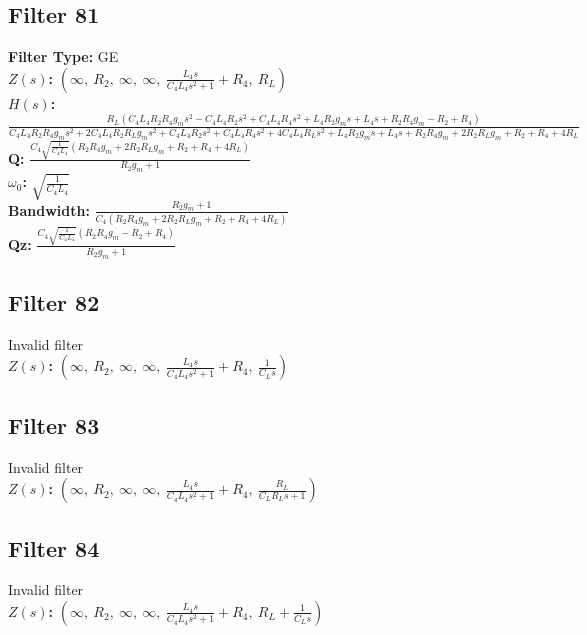 \documentclass{article}
\begin{document}
\subsection*{Filter 81}
\textbf{Filter Type:} GE \\ 
\textbf{$Z(s)$:} $\left( \infty, \  R_{2}, \  \infty, \  \infty, \  \frac{L_{4} s}{C_{4} L_{4} s^{2} + 1} + R_{4}, \  R_{L}\right)$ \\ 
\textbf{$H(s)$:} $\frac{R_{L} \left(C_{4} L_{4} R_{2} R_{4} g_{m} s^{2} - C_{4} L_{4} R_{2} s^{2} + C_{4} L_{4} R_{4} s^{2} + L_{4} R_{2} g_{m} s + L_{4} s + R_{2} R_{4} g_{m} - R_{2} + R_{4}\right)}{C_{4} L_{4} R_{2} R_{4} g_{m} s^{2} + 2 C_{4} L_{4} R_{2} R_{L} g_{m} s^{2} + C_{4} L_{4} R_{2} s^{2} + C_{4} L_{4} R_{4} s^{2} + 4 C_{4} L_{4} R_{L} s^{2} + L_{4} R_{2} g_{m} s + L_{4} s + R_{2} R_{4} g_{m} + 2 R_{2} R_{L} g_{m} + R_{2} + R_{4} + 4 R_{L}}$ \\ 
\textbf{Q:} $\frac{C_{4} \sqrt{\frac{1}{C_{4} L_{4}}} \left(R_{2} R_{4} g_{m} + 2 R_{2} R_{L} g_{m} + R_{2} + R_{4} + 4 R_{L}\right)}{R_{2} g_{m} + 1}$ \\ 
\textbf{$\omega_0$:} $\sqrt{\frac{1}{C_{4} L_{4}}}$ \\ 
\textbf{Bandwidth:} $\frac{R_{2} g_{m} + 1}{C_{4} \left(R_{2} R_{4} g_{m} + 2 R_{2} R_{L} g_{m} + R_{2} + R_{4} + 4 R_{L}\right)}$ \\ 
\textbf{Qz:} $\frac{C_{4} \sqrt{\frac{1}{C_{4} L_{4}}} \left(R_{2} R_{4} g_{m} - R_{2} + R_{4}\right)}{R_{2} g_{m} + 1}$ \\ 
\subsection*{Filter 82}
Invalid filter \\ 
\textbf{$Z(s)$:} $\left( \infty, \  R_{2}, \  \infty, \  \infty, \  \frac{L_{4} s}{C_{4} L_{4} s^{2} + 1} + R_{4}, \  \frac{1}{C_{L} s}\right)$ \\ 
\subsection*{Filter 83}
Invalid filter \\ 
\textbf{$Z(s)$:} $\left( \infty, \  R_{2}, \  \infty, \  \infty, \  \frac{L_{4} s}{C_{4} L_{4} s^{2} + 1} + R_{4}, \  \frac{R_{L}}{C_{L} R_{L} s + 1}\right)$ \\ 
\subsection*{Filter 84}
Invalid filter \\ 
\textbf{$Z(s)$:} $\left( \infty, \  R_{2}, \  \infty, \  \infty, \  \frac{L_{4} s}{C_{4} L_{4} s^{2} + 1} + R_{4}, \  R_{L} + \frac{1}{C_{L} s}\right)$ \\ 
\end{document}
